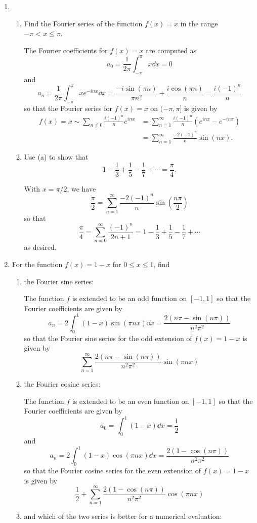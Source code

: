 \documentclass[11pt]{article}
\newcommand{\br}[1]{\left(#1\right)}
\begin{document}
\begin{enumerate}[label=28.\arabic*]
    \item \begin{enumerate}[label=(\alph*)]
        \item Find the Fourier series of the function $f(x) = x$ in the range $-\pi < x \leq \pi$.
        
        The Fourier coefficients for $f(x) = x$ are computed as \[a_0 = \frac{1}{2\pi} \int_{-\pi}^{\pi} x\dd{x} = 0\] and \[a_n = \frac{1}{2\pi}\int_{-\pi}^{\pi}xe^{-inx} \dd{x} = \frac{-i\sin(\pi n)}{\pi n^2} + \frac{i\cos(\pi n)}{n} = \frac{i(-1)^n}{n}\] so that the Fourier series for $f(x) = x$ on $(-\pi,\pi]$ is given by \begin{align*}
            f(x) = x \sim \sum_{n\neq 0} \frac{i(-1)^n}{n} e^{inx} &= \sum_{n=1}^\infty \frac{i(-1)^n}{n}\br{e^{inx} - e^{-inx}}\\
            &= \sum_{n=1}^\infty \frac{-2\left(-1\right)^{n}}{n}\sin(nx).
        \end{align*}
        \item Use (a) to show that \[1-\frac{1}{3} + \frac{1}{5} - \frac{1}{7} + \cdots = \frac{\pi}{4}.\]
        
        With $x = \pi/2$, we have \[\frac{\pi}{2} = \sum_{n=1}^\infty \frac{-2\left(-1\right)^{n}}{n}\sin(\frac{n\pi}{2})\] so that \[\frac{\pi}{4} = \sum_{n=0}^\infty \frac{(-1)^n}{2n+1} = 1-\frac{1}{3} + \frac{1}{5} - \frac{1}{7} + \cdots\] as desired.
    \end{enumerate}
    \item For the function $f(x) = 1-x$ for $0\leq x \leq 1$, find \begin{enumerate}[label=(\alph*)]
        \item the Fourier sine series:
        
        The function $f$ is extended to be an odd function on $[-1,1]$ so that the Fourier coefficients are given by \[a_n = 2\int_0^1 (1-x)\sin(\pi nx)\dd{x} = \frac{2\br{n \pi - \sin(n \pi)}}{n^2 \pi^2}\] so that the Fourier sine series for the odd extension of $f(x) = 1-x$ is given by \[\sum_{n=1}^{\infty} \frac{2\br{n \pi - \sin(n \pi)}}{n^2 \pi^2}\sin(\pi n x)\]
        \item the Fourier cosine series:
        
        The function $f$ is extended to be an even function on $[-1,1]$ so that the Fourier coefficients are given by \[a_0 = \int_0^1 (1-x)\dd{x} = \frac{1}{2}\] and \[a_n = 2\int_0^1 (1-x)\cos(\pi n x)\dd{x} = \frac{2 (1 - \cos(n \pi))}{n^2 \pi^2}\] so that the Fourier cosine series for the even extension of $f(x) = 1-x$ is given by \[\frac{1}{2} + \sum_{n=1}^{\infty}\frac{2 (1 - \cos(n \pi))}{n^2 \pi^2}\cos(\pi n x)\]
        \item and which of the two series is better for a numerical evaluation:
        

\end{enumerate}
\end{enumerate}
\end{document}
